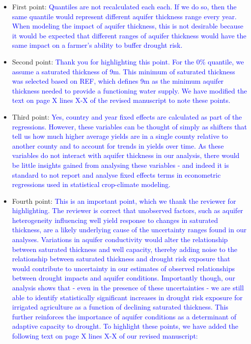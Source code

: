 \documentclass[
]{article}
\begin{document}
\begin{itemize}
\item
  First point:
  \textcolor{blue}{Quantiles are not recalculated each each. If we do so, then the same quantile would represent different aquifer thickness range every year. When modeling the impact of aquifer thickness, this is not desirable because it would be expected that different ranges of aquifer thickness would have the same impact on a farmer's ability to buffer drought risk.}
\item
  Second point:
  \textcolor{blue}{Thank you for highlighting this point. For the 0\% quantile, we assume a saturated thickness of 9m. This minimum of saturated thickness was selected based on REF, which defines 9m as the minimum aquifer thickness needed to provide a functioning water supply. We have modified the text on page X lines X-X of the revised manuscript to note these points.}
\item
  Third point:
  \textcolor{blue}{Yes, country and year fixed effects are calculated as part of the regressions. However, these variables can be thought of simply as shifters that tell us how much higher average yields are in a single county relative to another county and to account for trends in yields over time. As these variables do not interact with aquifer thickness in our analysis, there would be little insights gained from analysing these variables - and indeed it is standard to not report and analyse fixed effects terms in econometric regressions used in statistical crop-climate modeling.}
\item
  Fourth point:
  \textcolor{blue}{This is an important point, which we thank the reviewer for highlighting. The reviewer is correct that unobserved factors, such as aquifer heterogeneity influencing well yield response to changes in saturated thickness, are a likely underlying cause of the uncertainty ranges found in our analyses. Variations in aquifer conductivity would alter the relationship between saturated thickness and well capacity, thereby adding noise to the relationship between saturated thickness and drought risk exposure that would contribute to uncertainty in our estimates of observed relationships between drought impacts and aquifer conditions. Importantly though, our analysis shows that - even in the presence of these uncertainties - we are still able to identify statistically significant increases in drought risk exposure for irrigated agriculture as a function of declining saturated thickness. This further reinforces the importance of aquifer conditions as a determinant of adaptive capacity to drought. To highlight these points, we have added the following text on page X lines X-X of our revised manuscript:}
\end{itemize}
\end{document}
